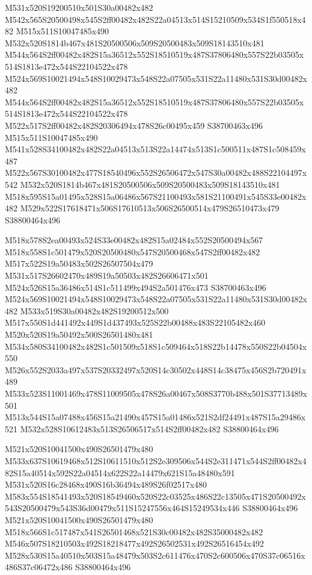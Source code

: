 \documentclass{article}
\begin{document}
\begin{multicols}{2}
M531x520S19200510x501S30a00482x482 M542x565S20500498x545S2ff00482x482S22a04513x514S15210509x534S1f550518x482 M515x511S10047485x490 M532x520S1814b467x481S20500506x509S20500483x509S18143510x481 M544x564S2ff00482x482S15a36512x552S18510519x487S37806480x557S22b03505x514S1813e472x544S22104522x478 M524x569S10021494x548S10029473x548S22a07505x531S22a11480x531S30d00482x482 M544x564S2ff00482x482S15a36512x552S18510519x487S37806480x557S22b03505x514S1813e472x544S22104522x478 M522x517S2ff00482x482S20306494x478S26c00495x459 S38700463x496 M515x511S10047485x490 M541x528S34100482x482S22a04513x513S22a14474x513S1c500511x487S1c508459x487 M522x567S30100482x477S18540496x552S26506472x547S30a00482x488S22104497x542 M532x520S1814b467x481S20500506x509S20500483x509S18143510x481 M518x595S15a01495x528S15a06486x567S21100493x581S21100491x545S33e00482x482 M529x522S17618471x506S17610513x506S26500514x479S26510473x479 S38800464x496

M518x578S2ea00493x524S33e00482x482S15a02484x552S20500494x567 M518x558S1c501479x520S20500480x547S20500468x547S2ff00482x482 M517x522S19a50483x502S26507504x479 M531x517S26602470x489S19a50503x482S26606471x501 M524x526S15a36486x514S1c511499x494S2a501476x473 S38700463x496 M524x569S10021494x548S10029473x548S22a07505x531S22a11480x531S30d00482x482 M533x519S30a00482x482S19200512x500 M517x550S1d441492x449S1d437493x525S22b00488x483S22105482x460 M520x520S19a50492x500S26501480x481 M534x580S34100482x482S1c501509x518S1c509464x518S22b14478x550S22b04504x550 M526x552S2033a497x537S20332497x520S14c30502x448S14c38475x456S2b720491x489 M533x523S11001469x478S11009505x478S26a00467x508S3770b488x501S37713489x501 M513x544S15a07488x456S15a21490x457S15a01486x521S2df24491x487S15a29486x521 M532x528S10612483x513S26506517x514S2ff00482x482 S38800464x496

M521x520S10041500x490S26501479x480 M533x637S10619468x512S10611510x512S2e309506x544S2e311471x544S2ff00482x482S15a40514x592S22a04514x622S22a14479x621S15a48480x591 M531x520S16c28468x490S16b36494x489S26f02517x480 M583x554S18541493x520S18549460x520S22c03525x486S22c13505x471S20500492x543S20500479x543S36d00479x511S15247556x464S15249534x446 S38800464x496 M521x520S10041500x490S26501479x480 M518x566S1c517487x541S26501468x521S30c00482x482S35000482x482 M546x507S18210503x492S18218477x492S26502531x492S26516454x492 M528x530S15a40510x503S15a48479x503S2c611476x470S2c600506x470S37c06516x486S37c06472x486 S38800464x496


\end{multicols}
\end{document}
